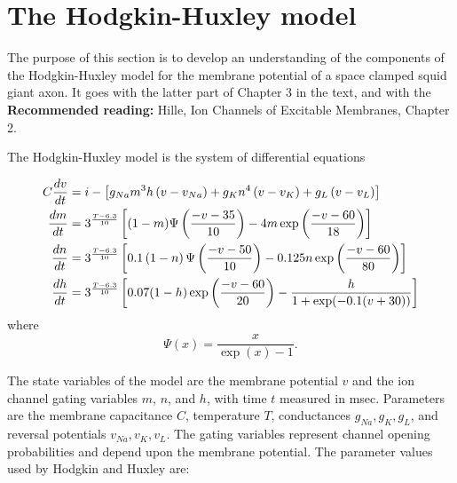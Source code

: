 \documentclass [11pt]{article}
\numberwithin{exercise}{section}
\begin{document}
\section{The Hodgkin-Huxley model}
The purpose of this section is to develop an understanding of the 
components of the Hodgkin-Huxley model for the membrane potential of
a space clamped squid giant axon. It goes with the latter part
of Chapter 3 in the text, and with the \textbf{Recommended reading:} 
Hille, Ion Channels of Excitable Membranes, Chapter 2.

The Hodgkin-Huxley model is the system of differential equations

\begin{equation*}
\begin{aligned} 
C \frac{dv}{dt} & =i - \left[g_{Na}m^{3}h \left(v-v_{Na}\right) 
+g_{K}n^{4}\left(v-v_{K}\right) +g_{L} \left(v-v_{L}\right) \right]  \\
\frac{dm}{dt}& =3^\frac{T-6.3}{10} \left[ (1-m) \Psi\left(\frac{-v-35}{10}\right) 
-4m \exp \left(\frac{-v-60}{18}\right) \right] \\
\frac{dn}{dt}&=3^\frac{T-6.3}{10} \left[ 0.1 \left( {1-n} \right) \Psi \left(\frac{-v-50}{10} \right) 
-0.125 n \exp \left(\frac{-v-60}{80} \right) \right]  \\
\frac{dh}{dt}&=3^\frac{T-6.3}{10} \left[0.07 {\left( {1-h}\right) 
\exp \nolimits \left( {{{-v-60} \over {20}}}\right) -{{h} \over {1+ \exp \nolimits ({-0.1(v+30)})}}} \right] 
\end{aligned}
\end{equation*}
where $$\Psi(x) = \frac{x}{\exp(x) - 1}. $$

The state variables of the model are the membrane potential $v$ and the ion channel
gating variables $m$, $n$, and $h$, with time $t$ measured in msec. Parameters are 
the membrane capacitance $C$, temperature $T$, conductances $g_{Na},g_K,g_L$, 
and reversal potentials $v_{Na},v_K,v_L$. The gating variables represent channel 
opening probabilities and depend upon the membrane potential.
The parameter values used by Hodgkin and Huxley are: 
\end{document}
